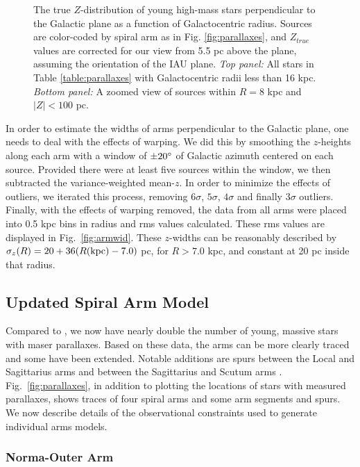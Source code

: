 \documentclass[12pt,preprint]{aastex}
\def\deg  {\ifmmode {^\circ}\else {$^\circ$}\fi}
\begin{document}
\begin{figure}[htp]
\caption{\small 
The true $Z$-distribution of young high-mass stars perpendicular
to the Galactic plane as a function of Galactocentric radius.  Sources
are color-coded by spiral arm as in Fig. \ref{fig:parallaxes}, and $Z_{true}$
values are corrected for our view from 5.5 pc above the plane,
assuming the orientation of the IAU plane. 
{\it Top panel:} All stars in Table \ref{table:parallaxes}
with Galactocentric radii less than 16 kpc.
{\it Bottom panel:} A zoomed view of sources within $R=8$ kpc and 
$|Z|<100$ pc.
        }
\label{fig:Zs}
\end{figure}

In order to estimate the widths of arms perpendicular to the Galactic plane,
one needs to deal with the effects of warping.  We did this by smoothing
the $z$-heights along each arm with a window of $\pm20\deg$ of Galactic azimuth
centered on each source.  Provided there were at least five sources within the window,
we then subtracted the variance-weighted mean-$z$.  In order to minimize the effects of 
outliers, we iterated this process, removing $6\sigma$, $5\sigma$, $4\sigma$ and finally $3\sigma$ 
outliers. Finally, with the effects of warping removed, the data from all arms were placed 
into 0.5 kpc bins in radius and rms values calculated.  These rms values are displayed in
Fig.~\ref{fig:armwid}.  These $z$-widths can be reasonably described by 
$\sigma_z(R) = 20 + 36( R({\rm kpc}) - 7.0 )$ pc, for $R>7.0$ kpc, and constant 
at 20 pc inside that radius.


\subsection{Updated Spiral Arm Model}\label{sect:armmodel}

Compared to \citet{Reid:14},
we now have nearly double the number of young, massive stars with maser parallaxes. 
Based on these data, the arms can be more clearly traced and some have been extended.   
Notable additions are spurs between the Local and Sagittarius arms \citep{Xu:16} 
and between the Sagittarius and Scutum arms \citep{Hu18}.  
Fig.~\ref{fig:parallaxes}, in addition to plotting the locations of stars
with measured parallaxes, shows traces of four spiral arms and some arm segments 
and spurs.  We now describe details of the observational constraints used to generate 
individual arms models.

\subsubsection{Norma-Outer Arm}\label{sect:Norma-Outer}
\end{document}
